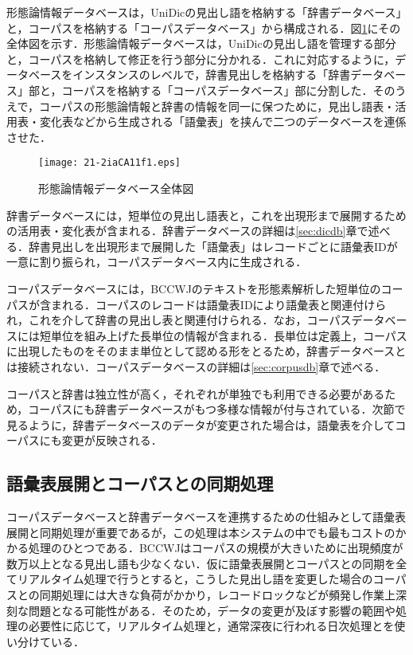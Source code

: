 \documentclass[japanese]{jnlp_1.4}
\begin{document}
形態論情報データベースは，UniDicの見出し語を格納する「辞書データベース」と，コーパスを格納する「コーパスデータベース」から構成される．図\ref{fig1}にその全体図を示す．形態論情報データベースは，UniDicの見出し語を管理する部分と，コーパスを格納して修正を行う部分に分かれる．これに対応するように，データベースをインスタンスのレベルで，辞書見出しを格納する「辞書データベース」部と，コーパスを格納する「コーパスデータベース」部に分割した．そのうえで，コーパスの形態論情報と辞書の情報を同一に保つために，見出し語表・活用表・変化表などから生成される「語彙表」を挟んで二つのデータベースを連係させた．

\begin{figure}[t]
\begin{center}
\texttt{[image: 21-2iaCA11f1.eps]}
\end{center}
\caption{形態論情報データベース全体図}
\label{fig1}
\end{figure}

辞書データベースには，短単位の見出し語表と，これを出現形まで展開するための活用表・変化表が含まれる．辞書データベースの詳細は\ref{sec:dicdb}章で述べる．辞書見出しを出現形まで展開した「語彙表」はレコードごとに語彙表IDが一意に割り振られ，コーパスデータベース内に生成される．

コーパスデータベースには，BCCWJのテキストを形態素解析した短単位のコーパスが含まれる．コーパスのレコードは語彙表IDにより語彙表と関連付けられ，これを介して辞書の見出し表と関連付けられる．なお，コーパスデータベースには短単位を組み上げた長単位の情報が含まれる．長単位は定義上，コーパスに出現したものをそのまま単位として認める形をとるため，辞書データベースとは接続されない．コーパスデータベースの詳細は\ref{sec:corpusdb}章で述べる．

コーパスと辞書は独立性が高く，それぞれが単独でも利用できる必要があるため，コーパスにも辞書データベースがもつ多様な情報が付与されている．次節で見るように，辞書データベースのデータが変更された場合は，語彙表を介してコーパスにも変更が反映される．


\subsection{語彙表展開とコーパスとの同期処理}
\label{sec:sync}

コーパスデータベースと辞書データベースを連携するための仕組みとして語彙表展開と同期処理が重要であるが，この処理は本システムの中でも最もコストのかかる処理のひとつである．BCCWJはコーパスの規模が大きいために出現頻度が数万以上となる見出し語も少なくない．仮に語彙表展開とコーパスとの同期を全てリアルタイム処理で行うとすると，こうした見出し語を変更した場合のコーパスとの同期処理には大きな負荷がかかり，レコードロックなどが頻発し作業上深刻な問題となる可能性がある．そのため，データの変更が及ぼす影響の範囲や処理の必要性に応じて，リアルタイム処理と，通常深夜に行われる日次処理とを使い分けている．
\end{document}
